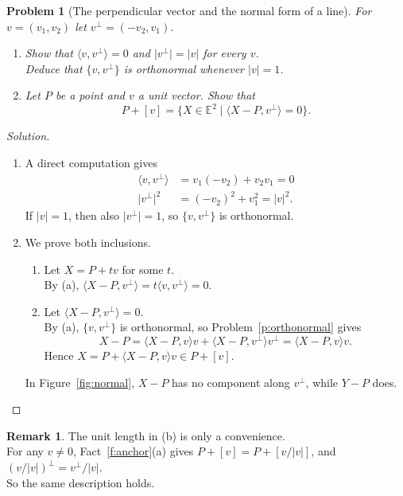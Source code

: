 \documentclass[11pt,a4paper]{article}
\theoremstyle{boxed}
\newtheorem{problem}{Problem}
\theoremstyle{definition}
\newtheorem*{remark}{Remark}
\newenvironment{solution}{\begin{proof}[Solution]}{\end{proof}}
\newcommand{\E}{\mathbb{E}^2}
\newcommand{\ip}[2]{\langle #1, #2 \rangle}
\newcommand{\abs}[1]{\lvert #1 \rvert}
\begin{document}
\begin{problem}[The perpendicular vector and the normal form of a line]\label{p:normal}
For $v=(v_1,v_2)$ let $v^\perp=(-v_2,v_1)$.
\begin{enumerate}
    \item Show that $\ip{v}{v^\perp}=0$ and $\abs{v^\perp}=\abs{v}$ for every $v$.\\
    Deduce that $\{v,v^\perp\}$ is orthonormal whenever $\abs{v}=1$.
    \item Let $P$ be a point and $v$ a unit vector. Show that
    \[
    P+[v]=\{X\in\E \mid \ip{X-P}{v^\perp}=0\}.
    \]
\end{enumerate}
\end{problem}

\begin{solution}
\leavevmode
\begin{enumerate}
    \item A direct computation gives
    \begin{align*}
    \ip{v}{v^\perp} &= v_1(-v_2)+v_2v_1=0\\
    \abs{v^\perp}^2 &= (-v_2)^2+v_1^2=\abs{v}^2.
    \end{align*}
    If $\abs{v}=1$, then also $\abs{v^\perp}=1$, so $\{v,v^\perp\}$ is orthonormal.
    \item We prove both inclusions.
    \begin{enumerate}[leftmargin=2.5em]
        \item[($\subseteq$)] Let $X=P+tv$ for some $t$.\\
        By (a), $\ip{X-P}{v^\perp}=t\ip{v}{v^\perp}=0$.
        \item[($\supseteq$)] Let $\ip{X-P}{v^\perp}=0$.\\
        By (a), $\{v,v^\perp\}$ is orthonormal, so Problem~\ref{p:orthonormal} gives
        \[
        X-P=\ip{X-P}{v}v+\ip{X-P}{v^\perp}v^\perp=\ip{X-P}{v}v.
        \]
        Hence $X=P+\ip{X-P}{v}v\in P+[v]$.
    \end{enumerate}
    In Figure~\ref{fig:normal}, $X-P$ has no component along $v^\perp$, while $Y-P$ does. \qedhere
\end{enumerate}
\end{solution}

\begin{remark}
The unit length in (b) is only a convenience.\\
For any $v\neq0$, Fact~\ref{f:anchor}(a) gives $P+[v]=P+[v/\abs{v}]$, and $(v/\abs{v})^\perp=v^\perp/\abs{v}$.\\
So the same description holds.
\end{remark}
\end{document}
